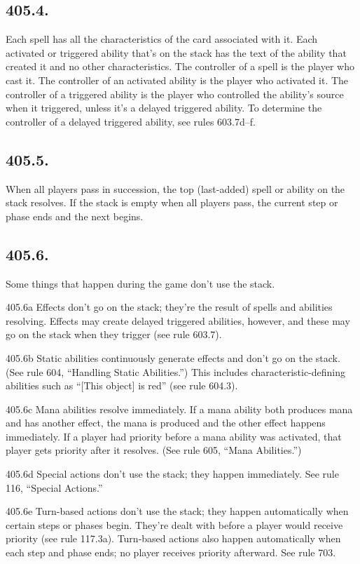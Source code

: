 \subsection*{405.4.}
Each spell has all the characteristics of the card associated with it. Each activated or triggered ability that’s on the stack has the text of the ability that created it and no other characteristics. The controller of a spell is the player who cast it. The controller of an activated ability is the player who activated it. The controller of a triggered ability is the player who controlled the ability’s source when it triggered, unless it’s a delayed triggered ability. To determine the controller of a delayed triggered ability, see rules 603.7d–f.

\subsection*{405.5.}
When all players pass in succession, the top (last-added) spell or ability on the stack resolves. If the stack is empty when all players pass, the current step or phase ends and the next begins.

\subsection*{405.6.}
Some things that happen during the game don’t use the stack.

405.6a Effects don’t go on the stack; they’re the result of spells and abilities resolving. Effects may create delayed triggered abilities, however, and these may go on the stack when they trigger (see rule 603.7).

405.6b Static abilities continuously generate effects and don’t go on the stack. (See rule 604, “Handling Static Abilities.”) This includes characteristic-defining abilities such as “[This object] is red” (see rule 604.3).

405.6c Mana abilities resolve immediately. If a mana ability both produces mana and has another effect, the mana is produced and the other effect happens immediately. If a player had priority before a mana ability was activated, that player gets priority after it resolves. (See rule 605, “Mana Abilities.”)

405.6d Special actions don’t use the stack; they happen immediately. See rule 116, “Special Actions.”

405.6e Turn-based actions don’t use the stack; they happen automatically when certain steps or phases begin. They’re dealt with before a player would receive priority (see rule 117.3a). Turn-based actions also happen automatically when each step and phase ends; no player receives priority afterward. See rule 703.

